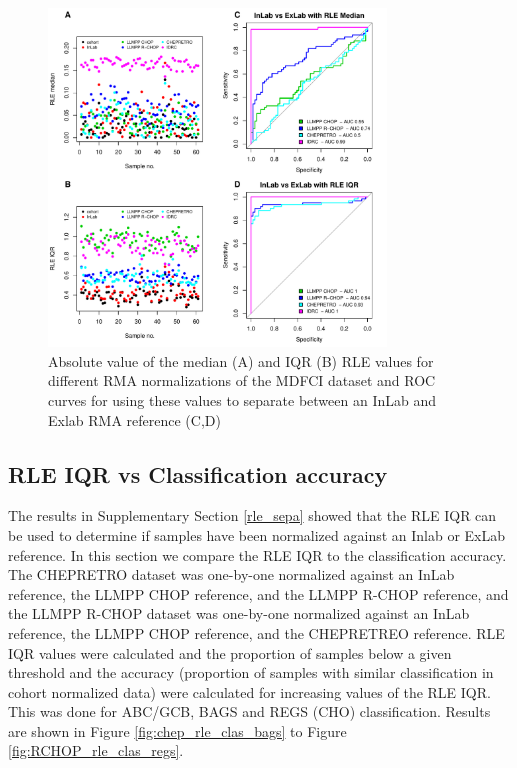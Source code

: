 \begin{figure}[!h]
	\begin{center}
		\includegraphics[width=0.8\textwidth]{figures/MDFCI_rle.pdf}
	\end{center}
	\caption{Absolute value of the median (A) and IQR (B) RLE values for different RMA normalizations of the MDFCI dataset and ROC curves for using these values to separate between an InLab and Exlab RMA reference (C,D)}
	\label{fig:mdfci_rle}
\end{figure}



\subsection{RLE IQR vs Classification accuracy}
The results in Supplementary Section \ref{rle_sepa} showed that the RLE IQR can be used to determine if samples have been normalized against an Inlab or ExLab reference. In this section we compare the RLE IQR to the classification accuracy. The CHEPRETRO dataset was one-by-one normalized against an InLab reference, the LLMPP CHOP reference, and the LLMPP R-CHOP reference, and the LLMPP R-CHOP dataset was one-by-one normalized against an InLab reference, the LLMPP CHOP reference, and the CHEPRETREO reference. RLE IQR values were calculated and the proportion of samples below a given threshold and the accuracy (proportion of samples with similar classification in cohort normalized data) were calculated for increasing values of the RLE IQR. This was done for ABC/GCB, BAGS and REGS (CHO) classification. Results are shown in Figure \ref{fig:chep_rle_clas_bags} to Figure \ref{fig:RCHOP_rle_clas_regs}. 

